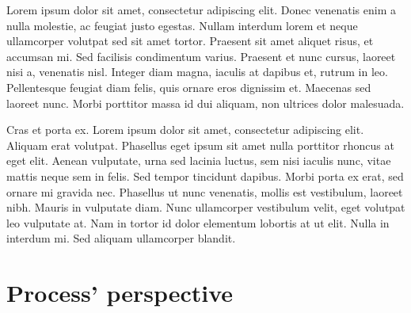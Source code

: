 \documentclass[12pt, a4paper, oneside]{book}
\begin{document}

Lorem ipsum dolor sit amet, consectetur adipiscing elit. Donec venenatis enim a nulla molestie, ac feugiat justo egestas. Nullam interdum lorem et neque ullamcorper volutpat sed sit amet tortor. Praesent sit amet aliquet risus, et accumsan mi. Sed facilisis condimentum varius. Praesent et nunc cursus, laoreet nisi a, venenatis nisl. Integer diam magna, iaculis at dapibus et, rutrum in leo. Pellentesque feugiat diam felis, quis ornare eros dignissim et. Maecenas sed laoreet nunc. Morbi porttitor massa id dui aliquam, non ultrices dolor malesuada.

Cras et porta ex. Lorem ipsum dolor sit amet, consectetur adipiscing elit. Aliquam erat volutpat. Phasellus eget ipsum sit amet nulla porttitor rhoncus at eget elit. Aenean vulputate, urna sed lacinia luctus, sem nisi iaculis nunc, vitae mattis neque sem in felis. Sed tempor tincidunt dapibus. Morbi porta ex erat, sed ornare mi gravida nec. Phasellus ut nunc venenatis, mollis est vestibulum, laoreet nibh. Mauris in vulputate diam. Nunc ullamcorper vestibulum velit, eget volutpat leo vulputate at. Nam in tortor id dolor elementum lobortis at ut elit. Nulla in interdum mi. Sed aliquam ullamcorper blandit.

\chapter{Process' perspective}
\end{document}
